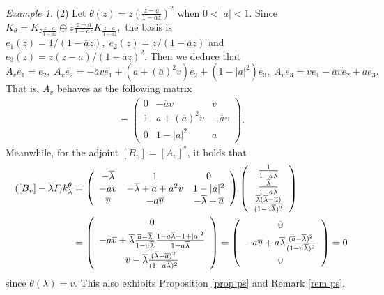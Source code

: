 \documentclass[12pt,reqno]{amsart}
\theoremstyle{definition}
\theoremstyle{remark}
\newtheorem{exm}[thm]{Example}
\numberwithin{equation}{section}
\newcommand{\ol}{\overline}
\begin{document}
\begin{exm}
(2)\;  Let $\theta(z)=z\left(\frac{z-a}{1-\ol{a}z}\right)^2$ when $0<|a|<1.$ Since $K_\theta= K_{z\frac{z-a}{1-\ol{a}z}}\oplus z\frac{z-a}{1-\ol{a}z}K_{ \frac{z-a}{1-\ol{a}z}} ,$   the basis is  $e_1(z)=1/(1-\ol{a}z),\;e_2(z)=z/(1-\ol{a}z)$ and $e_3(z)=z(z-a)/(1-\ol{a}z)^2.$  Then we deduce that $$A_ve_1=e_2,\;A_ve_2=-\ol{a}ve_1+(a+(\ol{a})^2v)e_2+(1-|a|^2)e_3,\; A_ve_3=ve_1-\ol{a}ve_2+ae_3.$$ That is, $A_v$ behaves as the following matrix
\begin{align*}[A_v]=\left(\begin{array}{ccc}0 &-\ol{a}v & v\\
1 & a+(\ol{a})^2v& -\ol{a}v\\ 0 & 1-|a|^2 & a    \end{array}\right).\end{align*}
Meanwhile, for the adjoint $[B_v]=[A_v]^*$, it holds that\begin{align*} ([B_v]-\ol{\lambda}I)k_{\lambda}^\theta
&=\left(\begin{array}{ccc}-\ol{\lambda} & 1 &0\\
-a\ol{v} & -\ol{\lambda}+\ol{a}+a^2\ol{v}& 1-|a|^2\\ \ol{v} &-a\ol{v} &-\ol{\lambda}+\ol{a}   \end{array}\right) \left(\begin{array}{c} \frac{1}{1-a \ol{\lambda}}\\ \frac{\ol{\lambda}}{1-a \ol{\lambda}}\\
\frac{\ol{\lambda}(\ol{\lambda}-\ol{a})}{(1-a \ol{\lambda})^2} \end{array}\right)\\&=\left(\begin{array}{c}0
\vspace{1mm} \\- a\ol{v} +\ol{\lambda}\frac{\ol{a}-\ol{\lambda}} {1-a \ol{\lambda}}\frac{1-a\ol{\lambda}-1+|a|^2}{1-a \ol{\lambda}} \vspace{1mm}\\ \ol{v} -\ol{\lambda}\frac{(\ol{\lambda}-\ol{a})^2}
{(1-a\ol{\lambda})^2} \end{array}\right)  =\left(\begin{array}{c}0
\vspace{1mm} \\- a\ol{v} + a\ol{\lambda}\frac{(\ol{a}-\ol{\lambda})^2} {(1-a \ol{\lambda})^2} \vspace{1mm}\\0\end{array}\right)= 0 \end{align*}
since  $\theta(\lambda)=v.$ This also exhibits Proposition \ref{prop ps} and Remark \ref{rem ps}.
\end{exm}
\end{document}
